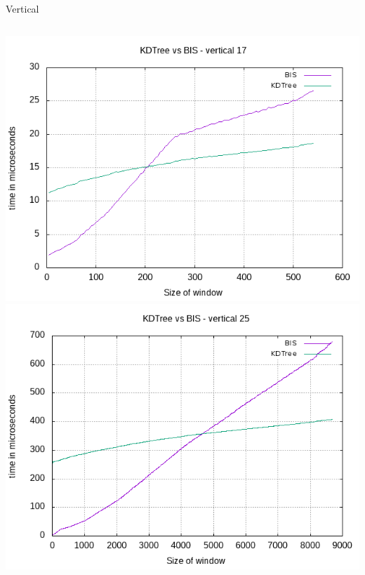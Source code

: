 \documentclass[pdf]{beamer}
\begin{document}
\begin{frame}{Vertical}
  \begin{columns}
    \includegraphics[scale=0.32]{pictures/analysis/vert_17.png}
    \includegraphics[scale=0.32]{pictures/analysis/vert_25.png}
  \end{columns}
\end{frame}
\end{document}
